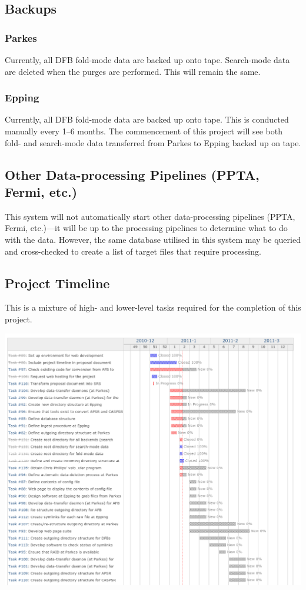 \documentclass[a4paper,11pt]{article}
\begin{document}
\subsection{Backups}
\subsubsection{Parkes}
Currently, all DFB fold-mode data are backed up onto tape. Search-mode data are deleted when the purges are performed. This will remain the same.

\subsubsection{Epping}
Currently, all DFB fold-mode data are backed up onto tape. This is conducted manually every 1--6 months. The commencement of this project will see both fold- and search-mode data transferred from Parkes to Epping backed up on tape.

\subsection{Other Data-processing Pipelines (PPTA, Fermi, etc.)}
This system will not automatically start other data-processing pipelines (PPTA, Fermi, etc.)---it will be up to the processing pipelines to determine what to do with the data. However, the same database utilised in this system may be queried and cross-checked to create a list of target files that require processing.

\subsection{Project Timeline}
This is a mixture of high- and lower-level tasks required for the completion of this project.

\includegraphics[scale=0.4]{timeline.png}
\end{document}
